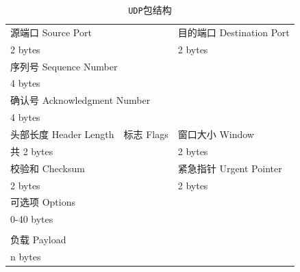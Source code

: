 \documentclass{article}
\begin{document}
\begin{table}[H]
  \centering
  \begin{tabularx}{0.8\textwidth}{|*{4}{X|}}
    \hline
    \multicolumn{2}{|X|}{源端口 Source Port}     & \multicolumn{2}{X|}{目的端口 Destination Port}                                          \\
    \multicolumn{2}{|X|}{2 bytes}                & \multicolumn{2}{X|}{2 bytes}                                                            \\
    \hline
    \multicolumn{4}{|X|}{序列号 Sequence Number}                                                                                           \\
    \multicolumn{4}{|X|}{4 bytes}                                                                                                          \\
    \hline
    \multicolumn{4}{|X|}{确认号 Acknowledgment Number}                                                                                     \\
    \multicolumn{4}{|X|}{4 bytes}                                                                                                          \\
    \hline
    \multicolumn{1}{|X|}{头部长度 Header Length} & \multicolumn{1}{X|}{标志 Flags}                & \multicolumn{2}{X|}{窗口大小 Window}   \\
    \multicolumn{2}{|X|}{共 2 bytes}             & \multicolumn{2}{X|}{2 bytes}                                                            \\
    \hline
    \multicolumn{2}{|X|}{校验和 Checksum}        & \multicolumn{2}{X|}{紧急指针 Urgent Pointer}                                            \\
    \multicolumn{2}{|X|}{2 bytes}                & \multicolumn{2}{X|}{2 bytes}                                                            \\
    \hline
    \multicolumn{4}{|X|}{可选项 Options}                                                                                                   \\
    \multicolumn{4}{|X|}{0-40 bytes}                                                                                                       \\
    \hline
                                                 &                                                &                                      & \\
    \hline
    \multicolumn{4}{|X|}{负载 Payload}                                                                                                     \\
    \multicolumn{4}{|X|}{n bytes}                                                                                                          \\
    \hline
  \end{tabularx}
  \caption{\texttt{UDP}包结构}
\end{table}
\end{document}
